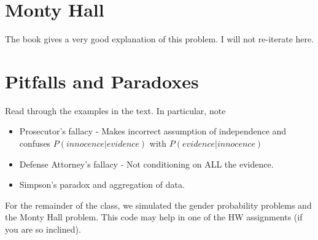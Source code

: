 \documentclass[12pt]{article} %
\begin{document}
\section{Monty Hall}
The book gives a very good explanation of this problem. I will not re-iterate here.
\section{Pitfalls and Paradoxes}
Read through the examples in the text. In particular, note
\begin{itemize}
\item Prosecutor's fallacy - Makes incorrect assumption of independence and confuses $P(innocence|evidence)$ with $P(evidence|innocence)$
\item Defense Attorney's fallacy - Not conditioning on ALL the evidence.
\item Simpson's paradox and aggregation of data.
\end{itemize}
For the remainder of the class, we simulated the gender probability problems and the Monty Hall problem. This code may help in one of the HW assignments (if you are so inclined).
\end{document}
